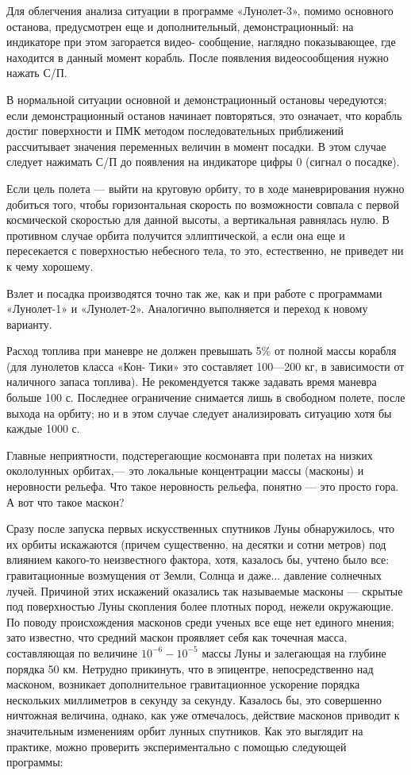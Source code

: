 \documentclass[11pt,a4paper,oneside]{article}
\begin{document}
Для облегчения анализа ситуации в программе «Лунолет-3», помимо основного останова, предусмотрен еще и дополнительный, демонстрационный: на индикаторе при этом загорается видео- сообщение, наглядно показывающее, где находится в данный момент корабль. После появления видеосообщения нужно нажать С/П.

В нормальной ситуации основной и демонстрационный остановы чередуются; если демонстрационный останов начинает повторяться, это означает, что корабль достиг поверхности и ПМК методом последовательных приближений рассчитывает значения переменных величин в момент посадки. В этом случае следует нажимать С/П до появления на индикаторе цифры 0 (сигнал о посадке).

Если цель полета — выйти на круговую орбиту, то в ходе маневрирования нужно добиться того, чтобы горизонтальная скорость по возможности совпала с первой космической скоростью для данной высоты, а вертикальная равнялась нулю. В противном случае орбита получится эллиптической, а если она еще и пересекается с поверхностью небесного тела, то это, естественно, не приведет ни к чему хорошему.

Взлет и посадка производятся точно так же, как и при работе с программами «Лунолет-1» и «Лунолет-2». Аналогично выполняется и переход к новому варианту.

Расход топлива при маневре не должен превышать 5\% от полной массы корабля (для лунолетов класса «Кон- Тики» это составляет 100—200 кг, в зависимости от наличного запаса топлива). Не рекомендуется также задавать время маневра больше 100 с. Последнее ограничение снимается лишь в свободном полете, после выхода на орбиту; но и в этом случае следует анализировать ситуацию хотя бы каждые 1000 с.

Главные неприятности, подстерегающие космонавта при полетах на низких окололунных орбитах,— это локальные концентрации массы (масконы) и неровности рельефа. Что такое неровность рельефа, понятно — это просто гора. А вот что такое маскон?

Сразу после запуска первых искусственных спутников Луны обнаружилось, что их орбиты искажаются (причем существенно, на десятки и сотни метров) под влиянием какого-то неизвестного фактора, хотя, казалось бы, учтено было все: гравитационные возмущения от Земли, Солнца и даже... давление солнечных лучей. Причиной этих искажений оказались так называемые масконы — скрытые под поверхностью Луны скопления более плотных пород, нежели окружающие. По поводу происхождения масконов среди ученых все еще нет единого мнения; зато известно, что средний маскон проявляет себя как точечная масса, составляющая по величине $10^{-6}-10^{-5}$ массы Луны и залегающая на глубине порядка 50 км. Нетрудно прикинуть, что в эпицентре, непосредственно над масконом, возникает дополнительное гравитационное ускорение порядка нескольких миллиметров в секунду за секунду. Казалось бы, это совершенно ничтожная величина, однако, как уже отмечалось, действие масконов приводит к значительным изменениям орбит лунных спутников. Как это выглядит на практике, можно проверить экспериментально с помощью следующей программы:
\end{document}

